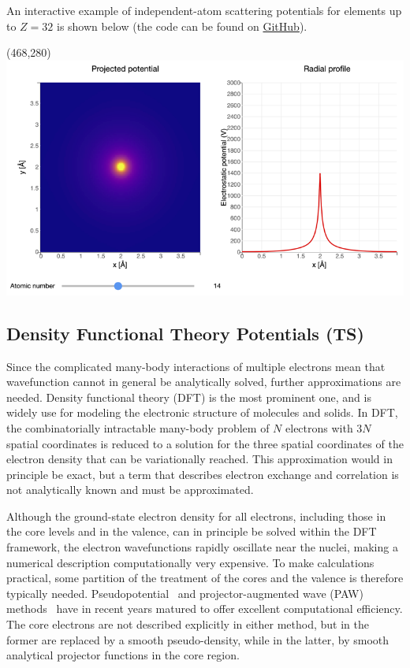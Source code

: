 \documentclass[%
 superscriptaddress,
 aip,
 amsmath,amssymb,
preprint,%
 author-year,%
longbibliography
]{revtex4-2}
\begin{document}
An interactive example of independent-atom scattering potentials for elements up to $Z = 32$ is shown below (the code can be found on \href{https://github.com/jacobjma/hands-on-guide-to-TEM-simulations/blob/main/notebooks/toma/Atomic_potentials.ipynb}{GitHub}).

\framebox(468,280){
\includegraphics[width=1\textwidth]{figures/Atomic_potentials_widget.png}}

\subsection*{Density Functional Theory Potentials (TS)}

Since the complicated many-body interactions of multiple electrons mean that wavefunction cannot in general be analytically solved, further approximations are needed. Density functional theory (DFT) is the most prominent one, and is widely use for modeling the electronic structure of molecules and solids. In DFT, the combinatorially intractable many-body problem of $N$ electrons with $3N$ spatial coordinates is reduced to a solution for the three spatial coordinates of the electron density that can be variationally reached. This approximation would in principle be exact, but a term that describes electron exchange and correlation is not analytically known and must be approximated.

Although the ground-state electron density for all electrons, including those in the core levels and in the valence, can in principle be solved within the DFT framework, the electron wavefunctions rapidly oscillate near the nuclei, making a numerical description computationally very expensive. To make calculations practical, some partition of the treatment of the cores and the valence is therefore typically needed. Pseudopotential~\cite{schwerdtfeger_pseudopotential_2011} and projector-augmented wave (PAW) methods~\cite{blochl_projector_1994} have in recent years matured to offer excellent computational efficiency. The core electrons are not described explicitly in either method, but in the former are replaced by a smooth pseudo-density, while in the latter, by smooth analytical projector functions in the core region.
\end{document}
